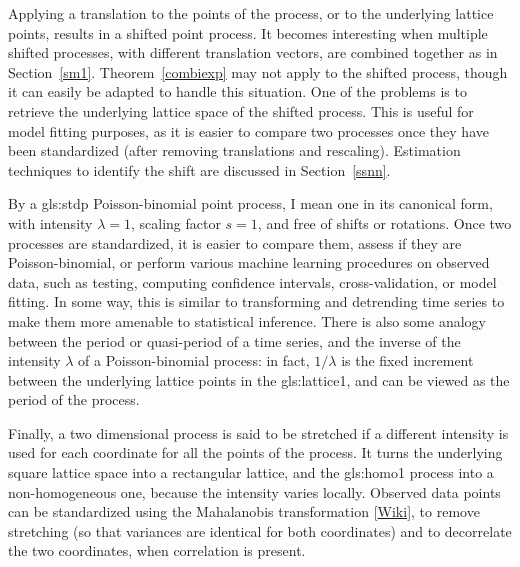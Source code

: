 \documentclass[10pt]{article}
\begin{document}
Applying a translation to the points of the process, or to the underlying lattice points, results in a \textcolor{index}{shifted point process}. It becomes interesting when multiple shifted processes, with different translation vectors, are combined together as in Section~\ref{sm1}. Theorem~\ref{combiexp} may not apply to the shifted process, though it can easily be adapted to handle this situation. One of the problems is to retrieve the underlying lattice space of the shifted process. This is useful for model fitting purposes, as it is easier to compare two processes once they have been standardized (after removing translations and rescaling). Estimation techniques to identify the shift are discussed in Section~\ref{ssnn}. 

By a 
\gls{gls:stdp}  Poisson-binomial point process, 
 I mean one in its canonical form, with intensity $\lambda=1$, scaling factor $s=1$, and free of shifts or rotations.  Once two processes are standardized, it is easier to compare them, assess if they are Poisson-binomial, or perform various machine learning procedures on observed data, such as testing, computing confidence intervals, cross-validation, or model fitting. In some way, this is similar to transforming and detrending time series to make them more amenable to statistical inference. There is also some analogy between the period or quasi-period of a time series, and the inverse of the intensity $\lambda$ of a Poisson-binomial process: in fact, $1/\lambda$ is the fixed increment between the underlying lattice points in the 
\gls{gls:lattice1}, %
 and can be viewed as the period of the process.

Finally, a two dimensional process is said to be \textcolor{index}{stretched} if a different intensity is used for each coordinate for all the points of the process. It turns the underlying square lattice space into a rectangular lattice, and the \gls{gls:homo1} process into a non-homogeneous one, because the intensity varies  locally. Observed data points can be standardized using the
\textcolor{index}{Mahalanobis transformation} [\href{https://en.wikipedia.org/wiki/Mahalanobis_distance}{Wiki}], to remove stretching (so that variances are identical for both coordinates) and to decorrelate the two coordinates, when correlation is present. 
\end{document}
